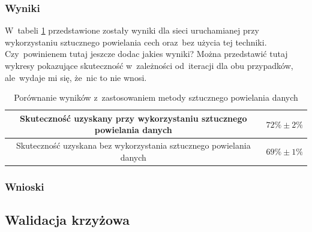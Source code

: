 \subsubsection{Wyniki}
W~tabeli \ref{table:catdogs} przedstawione zostały wyniki dla sieci uruchamianej przy wykorzystaniu sztucznego powielania cech oraz~bez użycia tej techniki. Czy~powinienem tutaj jeszcze dodac jakies wyniki? Można przedstawić tutaj wykresy pokazujące skuteczność w~zależności od~iteracji dla obu przypadków, ale~wydaje mi się, że~nic to nie wnosi.

\begin{table}
\centering
\begin{tabular}{|c|c|}
\hline
Skuteczność uzyskany przy wykorzystaniu sztucznego powielania danych & $72\% \pm 2\%$ \\
\hline 
Skuteczność uzyskana bez wykorzystania sztucznego powielania danych & $69\% \pm 1\%$ \\
\hline 
 \end{tabular}
 \caption{Porównanie wyników z~zastosowaniem metody sztucznego powielania danych} \label{table:catdogs}
\end{table}

\subsubsection{Wnioski}

\subsection{Walidacja krzyżowa}
